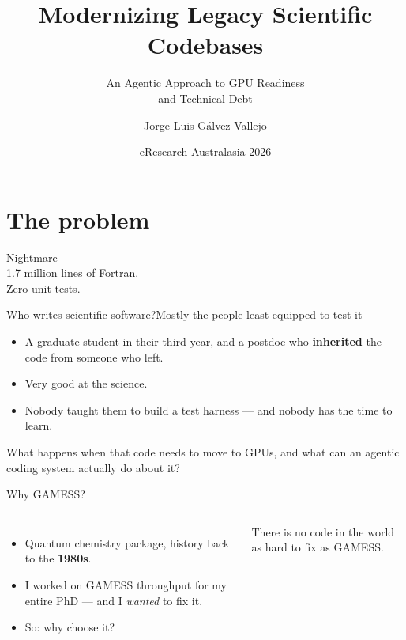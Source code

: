 \documentclass[aspectratio=169]{beamer}
\title[Agentic modernisation of legacy code]{Modernizing Legacy Scientific Codebases}
\subtitle{\small An Agentic Approach to GPU Readiness\\and Technical Debt}
\author[J.\ Gálvez Vallejo]{Jorge Luis Gálvez Vallejo}
\institute{NCI}
\date{eResearch Australasia 2026}
\begin{document}
\maketitle

\section{The problem}

\begin{frame}
  Nightmare \\ \Huge 1.7 million lines of Fortran.\\ Zero unit tests.
\end{frame}

\begin{frame}{Who writes scientific software?}{Mostly the people least equipped to test it}
  \begin{itemize}\setlength\itemsep{6pt}
    \item A graduate student in their third year, and a postdoc who \textbf{inherited} the code from someone who left.
    \item Very good at the science.
    \item Nobody taught them to build a test harness --- and nobody has the time to learn.
  \end{itemize}
  \vspace{.4em}
  \begin{cookiequote}
    What happens when that code needs to move to GPUs, and what can an agentic coding system actually do about it?
  \end{cookiequote}
\end{frame}

\begin{frame}{Why GAMESS?}
  \begin{columns}[T,onlytextwidth]
      \begin{itemize}\setlength\itemsep{6pt}
        \item Quantum chemistry package, history back to the \textbf{1980s}.
        \item I worked on GAMESS throughput for my entire PhD --- and I \emph{wanted} to fix it.
        \item So: why choose it?
      \end{itemize}
      \begin{cookiecard}[title=My claim]
        There is no code in the world as hard to fix as GAMESS. 
      \end{cookiecard}
  \end{columns}
\end{frame}
\end{document}
